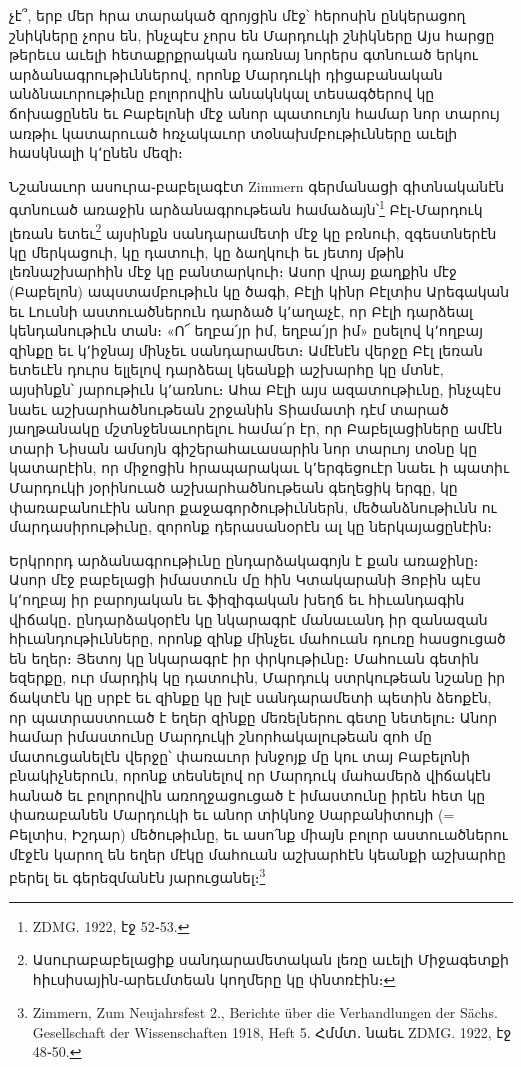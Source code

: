 \documentclass{article}
\begin{document}
{չէ՞, երբ մեր հրա տարակած զրոյցին մէջ՝ հերոսին ընկերացող շնիկները չորս են, ինչպէս չորս են Մարդուկի շնիկները Այս հարցը թերեւս աւելի հետաքրքրական դառնայ նորերս գտնուած երկու արձանագրութիւններով, որոնք Մարդուկի դիցաբանական անձնաւորութիւնը բոլորովին անակնկալ տեսագծերով կը ճոխացընեն եւ Բաբելոնի մէջ անոր պատուոյն համար նոր տարույ առթիւ կատարուած հռչակաւոր տօնախմբութիւնները աւելի հասկնալի կ՚ընեն մեզի։

Նշանաւոր ասուրա֊բաբելագէտ Zimmern գերմանացի գիտնականէն գտնուած առաջին արձանագրութեան համաձայն՝\footnote{ZDMG. 1922, էջ 52֊53.} Բէլ֊Մարդուկ լեռան ետեւ\footnote{Ասուրաբաբելացիք սանդարամետական լեռը աւելի Միջագետքի հիւսիսային֊արեւմտեան կողմերը կը փնտռէին։} այսինքն սանդարամետի մէջ կը բռնուի, զգեստներէն կը մերկացուի, կը դատուի, կը ձաղկուի եւ յետոյ մթին լեռնաշխարհին մէջ կը բանտարկուի։ Ասոր վրայ քաղքին մէջ (Բաբելոն) ապստամբութիւն կը ծագի, Բէլի կինր Բէլտիս Արեգական եւ Լուսնի աստուածներուն դարձած կ՚աղաչէ, որ Բէլի դարձեալ կենդանութիւն տան։ «Ո՜ եղբա՛յր իմ, եղբա՛յր իմ» ըսելով կ՚ողբայ զինքը եւ կ՚իջնայ մինչեւ սանդարամետ։ Ամէնէն վերջը Բէլ լեռան ետեւէն դուրս ելլելով դարձեալ կեանքի աշխարհը կը մտնէ, այսինքն՝ յարութիւն կ՚առնու։ Ահա Բէլի այս ազատութիւնը, ինչպէս նաեւ աշխարհածնութեան շրջանին Տիամատի դէմ տարած յաղթանակը մշտնջենաւորելու համա՛ր էր, որ Բաբելացիները ամէն տարի Նիսան ամսոյն գիշերահաւասարին նոր տարւոյ տօնը կը կատարէին, որ միջոցին հրապարակաւ կ՚երգեցուէր նաեւ ի պատիւ Մարդուկի յօրինուած աշխարհածնութեան գեղեցիկ երգը, կը փառաբանուէին անոր քաջագործութիւններն, մեծանձնութիւնն ու մարդասիրութիւնը, զորոնք դերասանօրէն ալ կը ներկայացընէին։

Երկրորդ արձանագրութիւնը ընդարձակագոյն է քան առաջինը։ Ասոր մէջ բաբելացի իմաստուն մը հին Կտակարանի Յոբին պէս կ՚ողբայ իր բարոյական եւ ֆիզիգական խեղճ եւ հիւանդագին վիճակը․ ընդարձակօրէն կը նկարագրէ մանաւանդ իր զանազան հիւանդութիւնները, որոնք զինք մինչեւ մահուան դուռը հասցուցած են եղեր։ Յետոյ կը նկարագրէ իր փրկութիւնը։ Մահուան գետին եզերքը, ուր մարդիկ կը դատուին, Մարդուկ ստրկութեան նշանը իր ճակտէն կը սրբէ եւ զինքը կը խլէ սանդարամետի պետին ձեոքէն, որ պատրաստուած է եղեր զինքը մեռելներու գետը նետելու։ Անոր համար իմաստունը Մարդուկի շնորհակալութեան զոհ մը մատուցանելէն վերջը՝ փառաւոր խնջոյք մը կու տայ Բաբելոնի բնակիչներուն, որոնք տեսնելով որ Մարդուկ մահամերձ վիճակէն հանած եւ բոլորովին առողջացուցած է իմաստունը իրեն հետ կը փառաբանեն Մարդուկի եւ անոր տիկնոջ Սարբանիտույի (= Բելտիս, Իշդար) մեծութիւնը, եւ ասո՛նք միայն բոլոր աստուածներու մէջէն կարող են եղեր մէկը մահուան աշխարհէն կեանքի աշխարհը բերել եւ գերեզմանէն յարուցանել։\footnote{Zimmern, Zum Neujahrsfest 2., Berichte über die Verhandlungen der Sächs. Gesellschaft der Wissenschaften 1918, Heft 5. Հմմտ․ նաեւ ZDMG. 1922, էջ 48֊50.}

}
\end{document}
